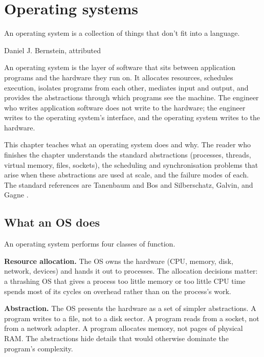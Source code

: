 \chapter{Operating systems}
\label{vol07:ch06}

\epigraph{An operating system is a collection of things that don't fit into a language.}{Daniel J. Bernstein, attributed}


\noindent
An operating system is the layer of software that sits between application programs and the hardware they run on. It allocates resources, schedules execution, isolates programs from each other, mediates input and output, and provides the abstractions through which programs see the machine. The engineer who writes application software does not write to the hardware; the engineer writes to the operating system's interface, and the operating system writes to the hardware.

This chapter teaches what an operating system does and why. The reader who finishes the chapter understands the standard abstractions (processes, threads, virtual memory, files, sockets), the scheduling and synchronisation problems that arise when these abstractions are used at scale, and the failure modes of each. The standard references are Tanenbaum and Bos \cite{text:tanenbaum-mos} and Silberschatz, Galvin, and Gagne \cite{text:silberschatz-galvin}.

\section{What an OS does}

An operating system performs four classes of function.

\textbf{Resource allocation.} The OS owns the hardware (CPU, memory, disk, network, devices) and hands it out to processes. The allocation decisions matter: a thrashing OS that gives a process too little memory or too little CPU time spends most of its cycles on overhead rather than on the process's work.

\textbf{Abstraction.} The OS presents the hardware as a set of simpler abstractions. A program writes to a file, not to a disk sector. A program reads from a socket, not from a network adapter. A program allocates memory, not pages of physical RAM. The abstractions hide details that would otherwise dominate the program's complexity.

